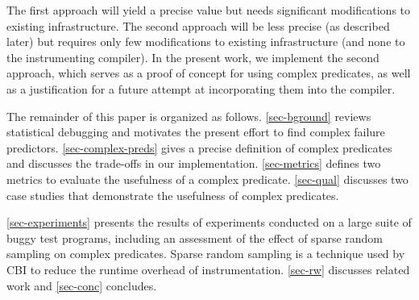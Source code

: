 The first approach will yield a precise value but needs significant modifications to existing infrastructure.  The second approach will be less precise (as described later) but requires only few modifications to existing infrastructure (and none to the instrumenting compiler).  In the present work, we implement the second approach, which serves as a proof of concept for using complex predicates, as well as a justification for a future attempt at incorporating them into the compiler.

The remainder of this paper is organized as follows.  \autoref{sec-bground} reviews statistical debugging and motivates the present effort to find complex failure predictors.  \autoref{sec-complex-preds} gives a precise definition of complex predicates and discusses the trade-offs in our implementation.  \autoref{sec-metrics} defines two metrics to evaluate the usefulness of a complex predicate.  \autoref{sec-qual} discusses two case studies that demonstrate the usefulness of complex predicates.

\autoref{sec-experiments} presents the results of experiments conducted on a large suite of buggy test programs, including an assessment of the effect of sparse random sampling on complex predicates.  Sparse random sampling is a technique used by CBI to reduce the runtime overhead of instrumentation.  \autoref{sec-rw} discusses related work and \autoref{sec-conc} concludes.
